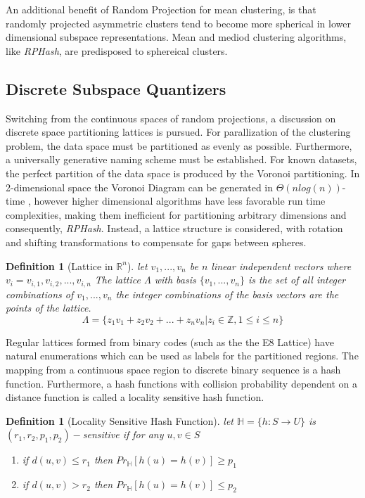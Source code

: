 \documentclass[a4paper,10pt]{article}
\newtheorem{Definition}[Theorem]{Definition}
\begin{document}
An additional benefit of Random Projection for mean clustering, is that
randomly projected asymmetric clusters tend to become more spherical in lower
dimensional subspace representations\cite{bingham}.  Mean and mediod clustering
algorithms, like \emph{RPHash}, are predisposed to sphereical clusters.

\subsection{Discrete Subspace Quantizers} Switching from the continuous spaces
of random projections, a discussion on discrete space partitioning lattices
is pursued.  For parallization of the clustering problem, the data space must
be partitioned as evenly as possible.  Furthermore, a universally generative
naming scheme must be established.  For known datasets, the perfect partition
of the data space is produced by the Voronoi partitioning\cite{Klein1988}.
In 2-dimensional space the Voronoi Diagram can be generated in $\Theta(n
log(n))$-time \cite{Fortune}, however higher dimensional algorithms
have less favorable run time complexities\cite{Gavrilova2003}, making
them inefficient for partitioning arbitrary dimensions and consequently,
\emph{RPHash}.	Instead, a lattice structure is considered, with rotation
and shifting transformations to compensate for gaps between spheres.
\begin{Definition}[Lattice in $\mathbb{R}^n$\cite{Pless}]
 let $v_1, ...  , v_n$ be $n$ linear independent vectors where $v_i=v_{i,1}, 
 v_{i,2}, ...  ,v_{i,n}$ 
The lattice $\Lambda$ with basis $\{v_1, ...  , v_n\}$ is the set of all 
integer combinations of $v_1, ...  , v_n$
the integer combinations of the basis vectors are the points of the lattice.
$$\Lambda = \{z_1v_1+z_2v_2+ ...  +z_nv_n | z_i\in \mathbb{Z}, 1 \leq i \leq 
n\}$$
\end{Definition}
Regular lattices formed from binary codes (such as the the E8 Lattice) have
natural enumerations which can be used as labels for the partitioned regions.
The mapping from a continuous space region to discrete binary sequence is a
hash function.	Furthermore, a hash functions with collision probability
dependent on a distance function is called a locality sensitive hash
function.
\begin{Definition}[Locality Sensitive Hash Function\cite{Datar}]
let $\mathbb{H}=\{h:S \rightarrow U\}$ is $(r_1,r_2,p_1,p_2)-$sensitive if for 
any $u,v\in S$
 \begin{enumerate}
   \item if $d(u,v) \leq r_1$ then $Pr_{\mathbb{H}}[h(u)=h(v)]\geq p_1$
   \item if $d(u,v) > r_2$ then $Pr_{\mathbb{H}}[h(u)=h(v)]\leq p_2$
 \end{enumerate}
\end{Definition}
\end{document}
